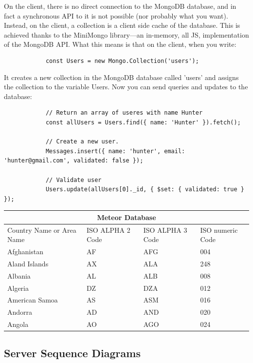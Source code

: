 \documentclass[12pt,a4paper]{report}
\begin{document}
		
		
		On the client, there is no direct connection to the MongoDB database, and in fact a synchronous API to it is not possible (nor probably what you want). Instead, on the client, a collection is a client side cache of the database. This is achieved thanks to the MiniMongo library—an in-memory, all JS, implementation of the MongoDB API. What this means is that on the client, when you write:
		
		\begin{lstlisting}
			const Users = new Mongo.Collection('users');
		\end{lstlisting}
		
		It creates a new collection in the MongoDB database called 'users' and assigns the collection to the variable Users. Now you can send queries and updates to the database:
		
		\begin{lstlisting}
			// Return an array of useres with name Hunter
			const allUsers = Users.find({ name: 'Hunter' }).fetch();
			
			// Create a new user.
			Messages.insert({ name: 'hunter', email: 'hunter@gmail.com', validated: false });
			
			// Validate user
			Users.update(allUsers[0]._id, { $set: { validated: true } });
		\end{lstlisting}
		
		
		
		
		\begin{tabular}{ |p{3cm}||p{3cm}|p{3cm}|p{3cm}|  }
			\hline
			\multicolumn{4}{|c|}{Meteor Database} \\
			\hline
			Country Name     or Area Name& ISO ALPHA 2 Code &ISO ALPHA 3 Code&ISO numeric Code\\
			\hline
			Afghanistan   & AF    &AFG&   004\\
			Aland Islands&   AX  & ALA   &248\\
			Albania &AL & ALB&  008\\
			Algeria    &DZ & DZA&  012\\
			American Samoa&   AS  & ASM&016\\
			Andorra& AD  & AND   &020\\
			Angola& AO  & AGO&024\\
			\hline
		\end{tabular}
		
	\subsection{Server Sequence Diagrams}
\end{document}
